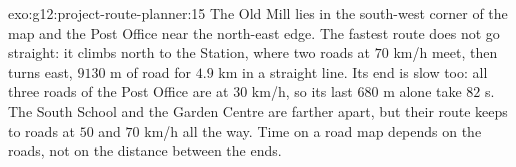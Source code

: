 \begin{solution}{exo:g12:project-route-planner:15}
The Old Mill lies in the south-west corner of the map and the Post Office near the north-east edge. The fastest route
does not go straight: it climbs north to the Station, where two roads at $70$ km/h meet, then turns east, $9130$ m
of road for $4.9$ km in a straight line. Its end is slow too: all three roads of the Post
Office are at $30$ km/h, so its last $680$ m alone take $82$ s. The South School and the Garden Centre are farther
apart, but their route keeps to roads at $50$ and $70$ km/h all the way. Time on a road map depends on
the roads, not on the distance between the ends.
\end{solution}
